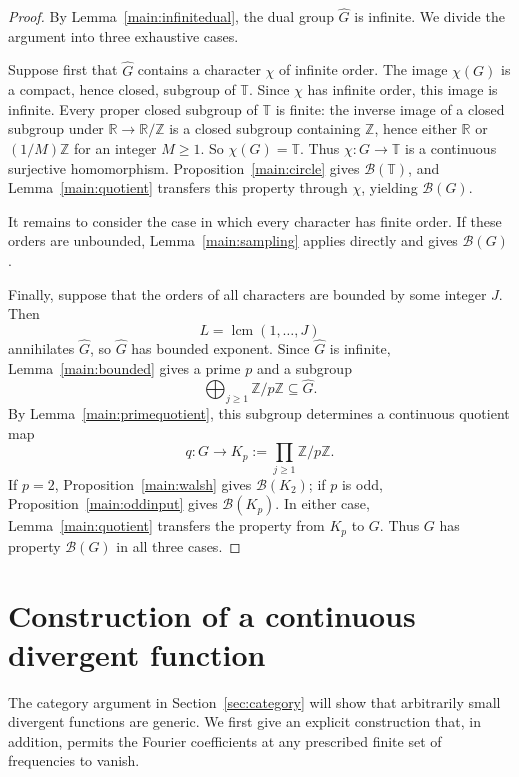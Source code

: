 \documentclass[11pt]{amsart}
\theoremstyle{definition}
\theoremstyle{remark}
\newcommand{\B}{\mathcal B}
\begin{document}
\begin{proof}
By Lemma~\ref{main:infinitedual}, the dual group \(\widehat G\) is
infinite. We divide the argument into three exhaustive cases.

Suppose first that \(\widehat G\) contains a character \(\chi\) of
infinite order. The image \(\chi(G)\) is a compact, hence closed,
subgroup of \(\mathbb T\). Since \(\chi\) has infinite order, this image
is infinite. Every proper closed subgroup of \(\mathbb T\) is finite:
the inverse image of a closed subgroup under
\(\mathbb R\to\mathbb R/\mathbb Z\) is a closed subgroup containing
\(\mathbb Z\), hence either \(\mathbb R\) or \((1/M)\mathbb Z\) for
an integer \(M\geq1\). So \(\chi(G)=\mathbb T\). Thus
\(\chi\colon G\to\mathbb T\) is a
continuous surjective homomorphism. Proposition~\ref{main:circle} gives
\(\B(\mathbb T)\), and Lemma~\ref{main:quotient} transfers this property
through \(\chi\), yielding \(\B(G)\).

It remains to consider the case in which every character has finite
order. If these orders are unbounded, Lemma~\ref{main:sampling} applies
directly and gives \(\B(G)\).

Finally, suppose that the orders of all characters are bounded by some
integer \(J\). Then
\[
 L=\operatorname{lcm}(1,\ldots,J)
\]
annihilates \(\widehat G\), so \(\widehat G\) has bounded exponent.
Since \(\widehat G\) is infinite, Lemma~\ref{main:bounded} gives a prime
\(p\) and a subgroup
\[
 \bigoplus_{j\geq1}\mathbb Z/p\mathbb Z
 \subseteq\widehat G.
\]
By Lemma~\ref{main:primequotient}, this subgroup determines a continuous
quotient map
\[
 q\colon G\longrightarrow
 K_p:=\prod_{j\geq1}\mathbb Z/p\mathbb Z.
\]
If \(p=2\), Proposition~\ref{main:walsh} gives \(\B(K_2)\); if \(p\) is
odd, Proposition~\ref{main:oddinput} gives \(\B(K_p)\). In either case,
Lemma~\ref{main:quotient} transfers the property from \(K_p\) to \(G\).
Thus \(G\) has property \(\B(G)\) in all three cases.
\end{proof}

\section{Construction of a continuous divergent function}\label{sec:construction}
The category argument in Section~\ref{sec:category} will show that
arbitrarily small divergent functions are generic. We first give an
explicit construction that, in addition, permits the Fourier
coefficients at any prescribed finite set of frequencies to vanish.
\end{document}
